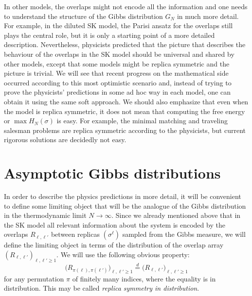 \documentclass[12pt]{article}
\theoremstyle{nonumberplain}
\begin{document}
In other models, the overlaps might not encode all the information and one needs to understand the structure of the Gibbs distribution $G_N$ in much more detail. For example, in the diluted SK model, the Parisi ansatz for the overlaps still plays the central role, but it is only a starting point of a more detailed description. Nevertheless, physicists predicted that the picture that describes the behaviour of the overlaps in the SK model should be universal and shared by other models, except that some models might be replica symmetric and the picture is trivial. We will see that recent progress on the mathematical side occurred according to this most optimistic scenario and, instead of trying to prove the physicists' predictions in some ad hoc way in each model, one can obtain it using the same soft approach. We should also emphasize that even when the model is replica symmetric, it does not mean that computing the free energy or $\max H_N(\sigma)$ is easy. For example, the minimal matching and traveling salesman problems are replica symmetric according to the physicists, but current rigorous solutions are decidedly not easy. 




\section{Asymptotic Gibbs distributions} 

In order to describe the physics predictions in more detail, it will be convenient to define some limiting object that will be the analogue of the Gibbs distribution in the thermodynamic limit $N\to\infty$. Since we already mentioned above that in the SK model all relevant information about the system is encoded by the overlaps $R_{\ell,\ell'}$ between replicas $(\sigma^\ell)$ sampled from the Gibbs measure, we will define the limiting object in terms of the distribution of the overlap array $(R_{\ell,\ell'})_{\ell,\ell'\geq 1}$. We will use the following obvious property:
\begin{equation}
\bigl(R_{\pi(\ell), \pi(\ell')}\bigr)_{\ell,\ell'\geq 1}  \stackrel{d}{=}\bigl(R_{\ell,\ell'}\bigr)_{\ell,\ell'\geq 1}
\label{ch12weakexch}
\end{equation}
for any permutation $\pi$ of finitely many indices, where the equality is in distribution. This may be called \emph{replica symmetry in distribution}. 
\end{document}
